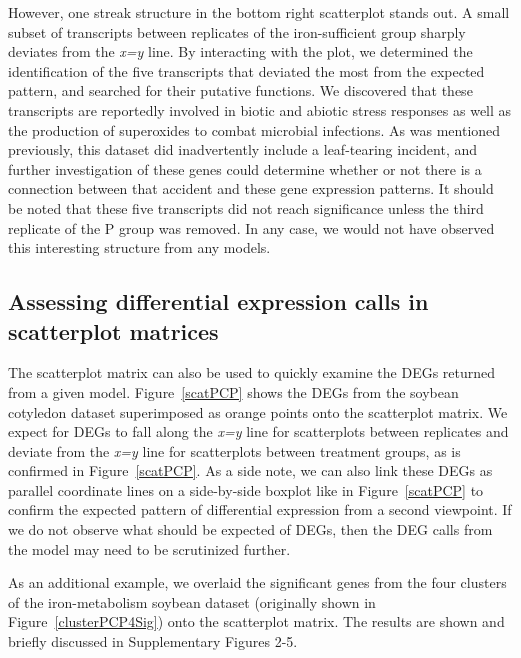 \documentclass{bioinfo}
\begin{document}
However, one streak structure in the bottom right scatterplot stands out. A small subset of transcripts between replicates of the iron-sufficient group sharply deviates from the \textit{x=y} line. By interacting with the plot, we determined the identification of the five transcripts that deviated the most from the expected pattern, and searched for their putative functions. We discovered that these transcripts are reportedly involved in biotic and abiotic stress responses as well as the production of superoxides to combat microbial infections. As was mentioned previously, this dataset did inadvertently include a leaf-tearing incident, and further investigation of these genes could determine whether or not there is a connection between that accident and these gene expression patterns. It should be noted that these five transcripts did not reach significance unless the third replicate of the P group was removed. In any case, we would not have observed this interesting structure from any models.

\subsection{Assessing differential expression calls in scatterplot matrices}

The scatterplot matrix can also be used to quickly examine the DEGs returned from a given model. Figure~\ref{scatPCP} shows the DEGs from the soybean cotyledon dataset superimposed as orange points onto the scatterplot matrix. We expect for DEGs to fall along the \textit{x=y} line for scatterplots between replicates and deviate from the \textit{x=y} line for scatterplots between treatment groups, as is confirmed in Figure~\ref{scatPCP}. As a side note, we can also link these DEGs as parallel coordinate lines on a side-by-side boxplot like in Figure~\ref{scatPCP} to confirm the expected pattern of differential expression from a second viewpoint. If we do not observe what should be expected of DEGs, then the DEG calls from the model may need to be scrutinized further.

As an additional example, we overlaid the significant genes from the four clusters of the iron-metabolism soybean dataset (originally shown in Figure~\ref{clusterPCP4Sig}) onto the scatterplot matrix. The results are shown and briefly discussed in Supplementary Figures 2-5. 

\end{document}

